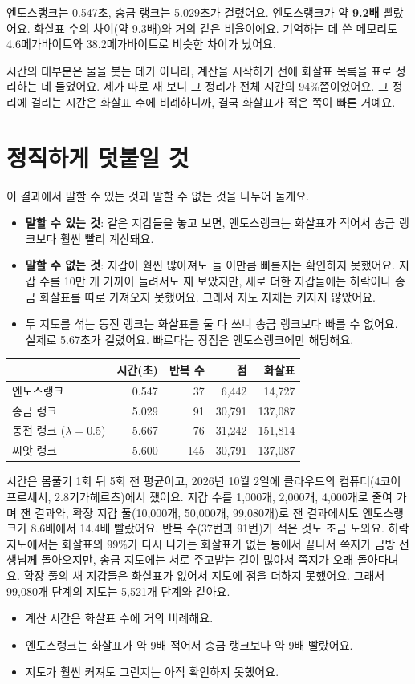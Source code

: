 엔도스랭크는 0.547초, 송금 랭크는 5.029초가 걸렸어요.
엔도스랭크가 약 \textbf{9.2배} 빨랐어요.
화살표 수의 차이(약 9.3배)와 거의 같은 비율이에요.
기억하는 데 쓴 메모리도 4.6메가바이트와 38.2메가바이트로 비슷한 차이가 났어요.

시간의 대부분은 물을 붓는 데가 아니라, 계산을 시작하기 전에 화살표 목록을 표로 정리하는 데 들었어요.
제가 따로 재 보니 그 정리가 전체 시간의 94\%쯤이었어요.
그 정리에 걸리는 시간은 화살표 수에 비례하니까, 결국 화살표가 적은 쪽이 빠른 거예요.

\section{정직하게 덧붙일 것}

이 결과에서 말할 수 있는 것과 말할 수 없는 것을 나누어 둘게요.

\begin{itemize}
\item \textbf{말할 수 있는 것}: 같은 지갑들을 놓고 보면, 엔도스랭크는 화살표가 적어서 송금 랭크보다 훨씬 빨리 계산돼요.
\item \textbf{말할 수 없는 것}: 지갑이 훨씬 많아져도 늘 이만큼 빠를지는 확인하지 못했어요.
      지갑 수를 10만 개 가까이 늘려서도 재 보았지만, 새로 더한 지갑들에는 허락이나 송금 화살표를 따로 가져오지 못했어요.
      그래서 지도 자체는 커지지 않았어요.
\item 두 지도를 섞는 동전 랭크는 화살표를 둘 다 쓰니 송금 랭크보다 빠를 수 없어요. 실제로 5.67초가 걸렸어요.
      빠르다는 장점은 엔도스랭크에만 해당해요.
\end{itemize}

\begin{deeper}[진짜 숫자]
\begin{center}
\small
\begin{tabular}{@{}lrrrr@{}}
\toprule
& 시간(초) & 반복 수 & 점 & 화살표 \\
\midrule
엔도스랭크 & 0.547 & 37 & 6,442 & 14,727 \\
송금 랭크 & 5.029 & 91 & 30,791 & 137,087 \\
동전 랭크 ($\lambda=0.5$) & 5.667 & 76 & 31,242 & 151,814 \\
씨앗 랭크 & 5.600 & 145 & 30,791 & 137,087 \\
\bottomrule
\end{tabular}
\end{center}
시간은 몸풀기 1회 뒤 5회 잰 평균이고, 2026년 10월 2일에 클라우드의 컴퓨터(4코어 프로세서, 2.8기가헤르츠)에서 쟀어요. 지갑 수를 1,000개, 2,000개, 4,000개로 줄여 가며 잰 결과와,
확장 지갑 풀(10,000개, 50,000개, 99,080개)로 잰 결과에서도 엔도스랭크가 8.6배에서 14.4배 빨랐어요.
반복 수(37번과 91번)가 적은 것도 조금 도와요. 허락 지도에서는 화살표의 99\%가 다시 나가는 화살표가 없는 통에서 끝나서 쪽지가 금방 선생님께 돌아오지만, 송금 지도에는 서로 주고받는 길이 많아서 쪽지가 오래 돌아다녀요.
확장 풀의 새 지갑들은 화살표가 없어서 지도에 점을 더하지 못했어요. 그래서 99,080개 단계의 지도는 5,521개 단계와 같아요.
\end{deeper}

\begin{learned}
\begin{itemize}
\item 계산 시간은 화살표 수에 거의 비례해요.
\item 엔도스랭크는 화살표가 약 9배 적어서 송금 랭크보다 약 9배 빨랐어요.
\item 지도가 훨씬 커져도 그런지는 아직 확인하지 못했어요.
\end{itemize}
\end{learned}

